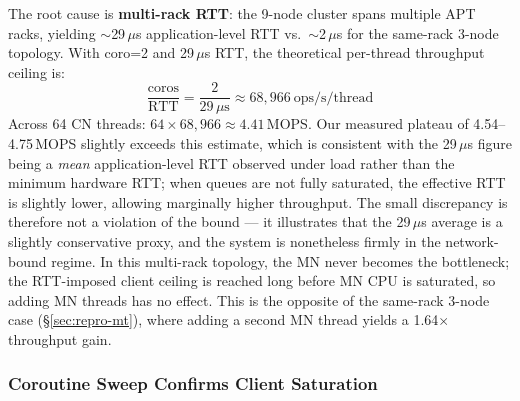 \documentclass[conference]{IEEEtran}
\begin{document}
The root cause is \textbf{multi-rack RTT}: the 9-node cluster spans multiple APT racks, yielding $\sim$29\,$\mu$s application-level RTT vs.\ $\sim$2\,$\mu$s for the same-rack 3-node topology. With coro=2 and 29\,$\mu$s RTT, the theoretical per-thread throughput ceiling is:
\[
  \frac{\text{coros}}{\text{RTT}} = \frac{2}{29\,\mu\text{s}} \approx 68{,}966\ \text{ops/s/thread}
\]
Across 64 CN threads: $64 \times 68{,}966 \approx 4.41$\,MOPS. Our measured plateau of 4.54--4.75\,MOPS slightly exceeds this estimate, which is consistent with the 29\,$\mu$s figure being a \emph{mean} application-level RTT observed under load rather than the minimum hardware RTT; when queues are not fully saturated, the effective RTT is slightly lower, allowing marginally higher throughput. The small discrepancy is therefore not a violation of the bound --- it illustrates that the 29\,$\mu$s average is a slightly conservative proxy, and the system is nonetheless firmly in the network-bound regime. In this multi-rack topology, the MN never becomes the bottleneck; the RTT-imposed client ceiling is reached long before MN CPU is saturated, so adding MN threads has no effect. This is the opposite of the same-rack 3-node case (\S\ref{sec:repro-mt}), where adding a second MN thread yields a 1.64$\times$ throughput gain.

\subsubsection{Coroutine Sweep Confirms Client Saturation}
\end{document}
